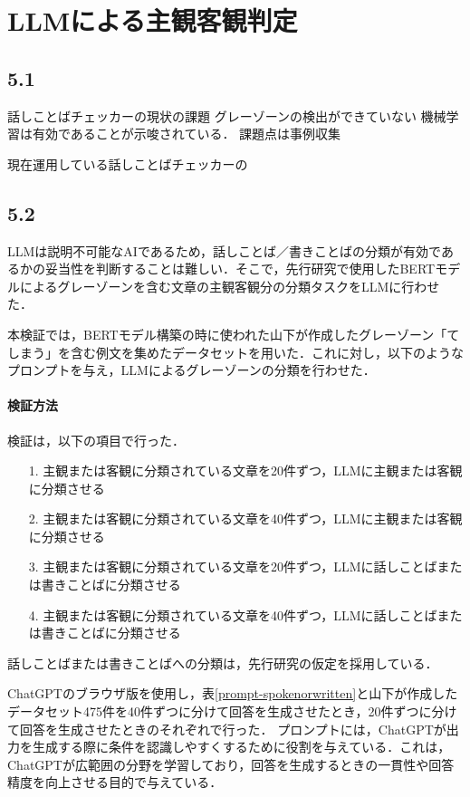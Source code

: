 \chapter{LLMによる主観客観判定 \label{c5}}

\section{5.1 \label{c5s1}}
話しことばチェッカーの現状の課題
グレーゾーンの検出ができていない
機械学習は有効であることが示唆されている．
課題点は事例収集

現在運用している話しことばチェッカーの



\section{5.2 \label{c5s2}}
LLMは説明不可能なAIであるため，話しことば／書きことばの分類が有効であるかの妥当性を判断することは難しい．そこで，先行研究で使用したBERTモデルによるグレーゾーンを含む文章の主観客観分の分類タスクをLLMに行わせた．

本検証では，BERTモデル構築の時に使われた山下が作成したグレーゾーン「てしまう」を含む例文を集めたデータセットを用いた．これに対し，以下のようなプロンプトを与え，LLMによるグレーゾーンの分類を行わせた．



\subsubsection{検証方法}
検証は，以下の項目で行った．
\begin{itemize}
    \item[1.] 主観または客観に分類されている文章を20件ずつ，LLMに主観または客観に分類させる
    \item[2.] 主観または客観に分類されている文章を40件ずつ，LLMに主観または客観に分類させる
    \item[3.] 主観または客観に分類されている文章を20件ずつ，LLMに話しことばまたは書きことばに分類させる
    \item[4.] 主観または客観に分類されている文章を40件ずつ，LLMに話しことばまたは書きことばに分類させる
\end{itemize}
話しことばまたは書きことばへの分類は，先行研究\cite{checker}の仮定を採用している．

ChatGPTのブラウザ版を使用し，表\ref{prompt-spokenorwritten}と山下が作成したデータセット475件を40件ずつに分けて回答を生成させたとき，20件ずつに分けて回答を生成させたときのそれぞれで行った．
プロンプトには，ChatGPTが出力を生成する際に条件を認識しやすくするために役割を与えている．これは，ChatGPTが広範囲の分野を学習しており，回答を生成するときの一貫性や回答精度を向上させる目的で与えている．

